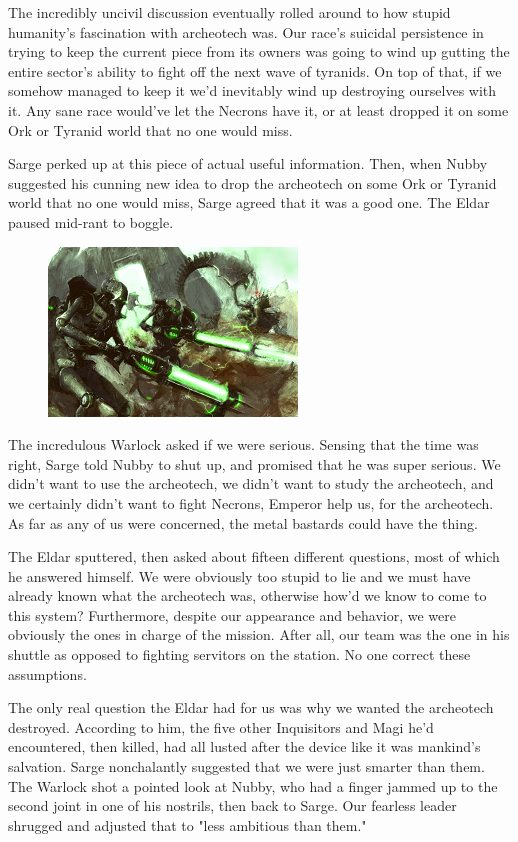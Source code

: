 The incredibly uncivil discussion eventually rolled around to how stupid humanity's fascination with archeotech was. 
Our race's suicidal persistence in trying to keep the current piece from its owners was going to wind up gutting the entire sector's ability to fight off the next wave of tyranids. 
On top of that, if we somehow managed to keep it we'd inevitably wind up destroying ourselves with it. 
Any sane race would've let the Necrons have it, or at least dropped it on some Ork or Tyranid world that no one would miss.

Sarge perked up at this piece of actual useful information. 
Then, when Nubby suggested his cunning new idea to drop the archeotech on some Ork or Tyranid world that no one would miss, Sarge agreed that it was a good one. 
The Eldar paused mid-rant to boggle.

\begin{figure}
	\begin{center}
		\includegraphics[width=\figwidth]{pics/11/61.png}
	\end{center}
\end{figure}
The incredulous Warlock asked if we were serious. 
Sensing that the time was right, Sarge told Nubby to shut up, and promised that he was super serious. 
We didn't want to use the archeotech, we didn't want to study the archeotech, and we certainly didn't want to fight Necrons, Emperor help us, for the archeotech. 
As far as any of us were concerned, the metal bastards could have the thing.

The Eldar sputtered, then asked about fifteen different questions, most of which he answered himself. 
We were obviously too stupid to lie and we must have already known what the archeotech was, otherwise how'd we know to come to this system? 
Furthermore, despite our appearance and behavior, we were obviously the ones in charge of the mission. 
After all, our team was the one in his shuttle as opposed to fighting servitors on the station. 
No one correct these assumptions.

The only real question the Eldar had for us was why we wanted the archeotech destroyed. 
According to him, the five other Inquisitors and Magi he'd encountered, then killed, had all lusted after the device like it was mankind's salvation. 
Sarge nonchalantly suggested that we were just smarter than them. 
The Warlock shot a pointed look at Nubby, who had a finger jammed up to the second joint in one of his nostrils, then back to Sarge. 
Our fearless leader shrugged and adjusted that to "less ambitious than them."

